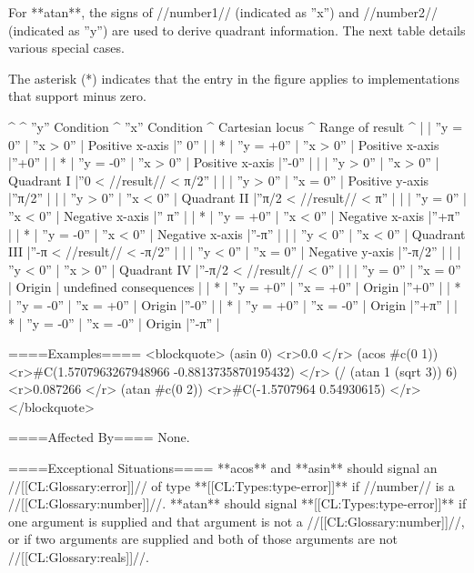 For **atan**, the signs of //number1// (indicated as ''x'') and //number2// (indicated as ''y'') are used to derive quadrant information. The next table details various special cases.

The asterisk (*) indicates that the entry in the figure applies to implementations that support minus zero.

^   ^ ''y'' Condition  ^ ''x'' Condition  ^ Cartesian locus ^ Range of result           ^
|   | ''y = 0''        | ''x > 0''        | Positive x-axis |'' 0''                     |
| * | ''y = +0''       | ''x > 0''        | Positive x-axis |''+0''                     |
| * | ''y = -0''       | ''x > 0''        | Positive x-axis |''-0''                     |
|   | ''y > 0''        | ''x > 0''        | Quadrant I      |''0 < //result// < π/2''   |
|   | ''y > 0''        | ''x = 0''        | Positive y-axis |''π/2''                    |
|   | ''y > 0''        | ''x < 0''        | Quadrant II     |''π/2 < //result// < π''   |
|   | ''y = 0''        | ''x < 0''        | Negative x-axis |'' π''                     |
| * | ''y = +0''       | ''x < 0''        | Negative x-axis |''+π''                     |
| * | ''y = -0''       | ''x < 0''        | Negative x-axis |''-π''                     |
|   | ''y < 0''        | ''x < 0''        | Quadrant III    |''-π < //result// < -π/2'' |
|   | ''y < 0''        | ''x = 0''        | Negative y-axis |''-π/2''                   |
|   | ''y < 0''        | ''x > 0''        | Quadrant IV     |''-π/2 < //result// < 0''  |
|   | ''y = 0''        | ''x = 0''        | Origin          | undefined consequences    |
| * | ''y = +0''       | ''x = +0''       | Origin          |''+0''                     |
| * | ''y = -0''       | ''x = +0''       | Origin          |''-0''                     |
| * | ''y = +0''       | ''x = -0''       | Origin          |''+π''                     |
| * | ''y = -0''       | ''x = -0''       | Origin          |''-π''                     |

====Examples====
<blockquote>
(asin 0) <r>0.0 </r>
(acos #c(0 1)) <r>#C(1.5707963267948966 -0.8813735870195432) </r>
(/ (atan 1 (sqrt 3)) 6) <r>0.087266 </r>
(atan #c(0 2)) <r>#C(-1.5707964 0.54930615) </r>
</blockquote>

====Affected By====
None.

====Exceptional Situations====
**acos** and **asin** should signal an //[[CL:Glossary:error]]// of type **[[CL:Types:type-error]]** if //number// is a //[[CL:Glossary:number]]//. **atan** should signal **[[CL:Types:type-error]]** if one argument is supplied and that argument is not a //[[CL:Glossary:number]]//, or if two arguments are supplied and both of those arguments are not //[[CL:Glossary:reals]]//.

